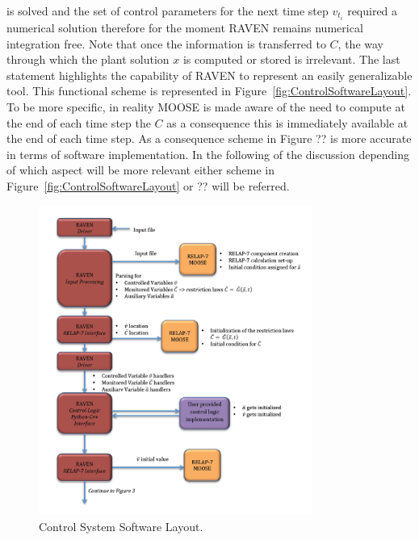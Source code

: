 \documentclass{mc2013}
\begin{document}
is solved and the set of control parameters for the next time step $v_{t_{i}}$ required a numerical solution therefore for the moment RAVEN remains numerical integration free. 
Note that once the information is transferred to $C$, the way through which the plant
solution $x$ is computed or stored is irrelevant. The last statement highlights the capability of RAVEN to
represent an easily generalizable tool. This functional scheme is represented in Figure~\ref{fig:ControlSoftwareLayout}.
To be more specific, in reality MOOSE is made aware of the need to compute at the end of each time step the $C$ as a consequence this is immediately available at the end of each time step. As a consequence scheme in Figure ?? is more accurate in terms of software implementation. In the following of the discussion depending of which aspect will be more relevant either scheme in Figure~\ref{fig:ControlSoftwareLayout} or ?? will be referred.
\begin{figure}[h] \label{fig:CalcFlow1}
  \centering
     \includegraphics[width=0.8\textwidth]{figures/CalculationFlow_part_1.PNG}
  \caption{Control System Software Layout.}
\end{figure}
\end{document}
